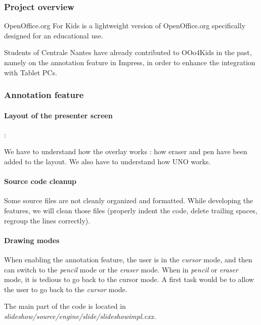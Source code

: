 \documentclass[a4paper,11pt]{article}
\begin{document}
\subsubsection*{Project overview}

OpenOffice.org For Kids is a lightweight version of OpenOffice.org
specifically designed for an educational use.

Students of Centrale Nantes have already contributed to OOo4Kids in the past,
namely on the annotation feature in Impress, in order to enhance the
integration with Tablet PCs.


\subsubsection*{Annotation feature}


\paragraph*{Layout of the presenter screen} :

We have to understand how the overlay works : how eraser and pen have been
added to the layout. We also have to understand how UNO works.



\paragraph*{Source code cleanup}

Some source files are not cleanly organized and formatted. While developing
the features, we will clean those files (properly indent the code, delete
trailing spaces, regroup the lines correctly).


\paragraph*{Drawing modes}

When enabling the annotation feature, the user is in the \emph{cursor} mode,
and then can switch to the \emph{pencil} mode or the \emph{eraser} mode. When
in \emph{pencil} or \emph{eraser} mode, it is tedious to go back to the cursor
mode. A first task would be to allow the user to go back to the \emph{cursor}
mode.

The main part of the code is located in
\emph{slideshow/source/engine/slide/slideshowimpl.cxx}.
\end{document}
